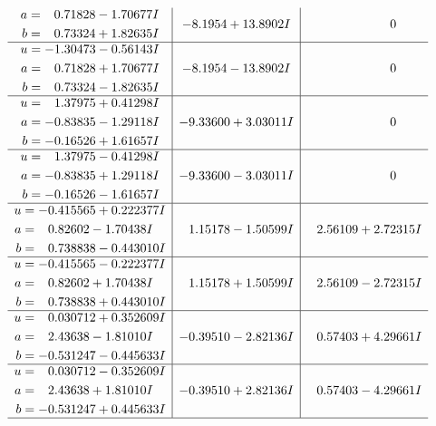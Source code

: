 \documentclass[1p]{elsarticle_modified}
\theoremstyle{definition}
\begin{document}
$$\begin{array}{c|c|c}
\begin{aligned}
a &= \phantom{-}0.71828 - 1.70677 I \\
b &= \phantom{-}0.73324 + 1.82635 I\end{aligned}
 & -8.1954 + 13.8902 I & \phantom{-0.000000 } 0 \\ \hline\begin{aligned}
u &= -1.30473 - 0.56143 I \\
a &= \phantom{-}0.71828 + 1.70677 I \\
b &= \phantom{-}0.73324 - 1.82635 I\end{aligned}
 & -8.1954 - 13.8902 I & \phantom{-0.000000 } 0 \\ \hline\begin{aligned}
u &= \phantom{-}1.37975 + 0.41298 I \\
a &= -0.83835 - 1.29118 I \\
b &= -0.16526 + 1.61657 I\end{aligned}
 & -9.33600 + 3.03011 I & \phantom{-0.000000 } 0 \\ \hline\begin{aligned}
u &= \phantom{-}1.37975 - 0.41298 I \\
a &= -0.83835 + 1.29118 I \\
b &= -0.16526 - 1.61657 I\end{aligned}
 & -9.33600 - 3.03011 I & \phantom{-0.000000 } 0 \\ \hline\begin{aligned}
u &= -0.415565 + 0.222377 I \\
a &= \phantom{-}0.82602 - 1.70438 I \\
b &= \phantom{-}0.738838 - 0.443010 I\end{aligned}
 & \phantom{-}1.15178 - 1.50599 I & \phantom{-}2.56109 + 2.72315 I \\ \hline\begin{aligned}
u &= -0.415565 - 0.222377 I \\
a &= \phantom{-}0.82602 + 1.70438 I \\
b &= \phantom{-}0.738838 + 0.443010 I\end{aligned}
 & \phantom{-}1.15178 + 1.50599 I & \phantom{-}2.56109 - 2.72315 I \\ \hline\begin{aligned}
u &= \phantom{-}0.030712 + 0.352609 I \\
a &= \phantom{-}2.43638 - 1.81010 I \\
b &= -0.531247 - 0.445633 I\end{aligned}
 & -0.39510 - 2.82136 I & \phantom{-}0.57403 + 4.29661 I \\ \hline\begin{aligned}
u &= \phantom{-}0.030712 - 0.352609 I \\
a &= \phantom{-}2.43638 + 1.81010 I \\
b &= -0.531247 + 0.445633 I\end{aligned}
 & -0.39510 + 2.82136 I & \phantom{-}0.57403 - 4.29661 I\\
 \hline 
 \end{array}$$\newpage\newpage\renewcommand{\arraystretch}{1}
\end{document}
